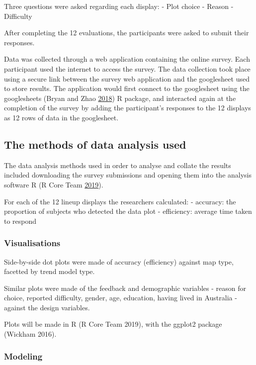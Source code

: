 \documentclass[conference,final,]{IEEEtran}
\begin{document}
Three questions were asked regarding each display: - Plot choice -
Reason - Difficulty

After completing the 12 evaluations, the participants were asked to
submit their responses.

Data was collected through a web application containing the online
survey. Each participant used the internet to access the survey. The
data collection took place using a secure link between the survey web
application and the googlesheet used to store results. The application
would first connect to the googlesheet using the googlesheets (Bryan and
Zhao \protect\hyperlink{ref-sheets}{2018}) R package, and interacted
again at the completion of the survey by adding the participant's
responses to the 12 displays as 12 rows of data in the googlesheet.

\hypertarget{the-methods-of-data-analysis-used}{%
\subsection{The methods of data analysis
used}\label{the-methods-of-data-analysis-used}}

The data analysis methods used in order to analyse and collate the
results included downloading the survey submissions and opening them
into the analysis software R (R Core Team
\protect\hyperlink{ref-RCore}{2019}).

For each of the 12 lineup displays the researchers calculated: -
accuracy: the proportion of subjects who detected the data plot -
efficiency: average time taken to respond

\hypertarget{visualisations}{%
\subsubsection{Visualisations}\label{visualisations}}

Side-by-side dot plots were made of accuracy (efficiency) against map
type, facetted by trend model type.

Similar plots were made of the feedback and demographic variables -
reason for choice, reported difficulty, gender, age, education, having
lived in Australia - against the design variables.

Plots will be made in R (R Core Team 2019), with the ggplot2 package
(Wickham 2016).

\hypertarget{modeling}{%
\subsubsection{Modeling}\label{modeling}}
\end{document}
